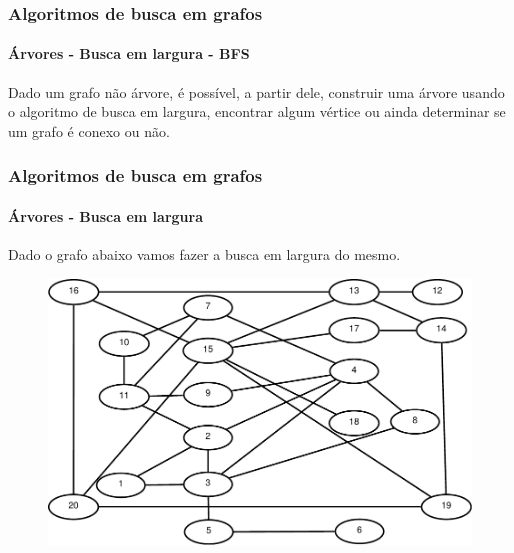 \begin{frame}
	\frametitle{Algoritmos de busca em grafos}
	\framesubtitle{Árvores - Busca em largura - BFS}
	\par Dado um grafo não árvore, é possível, a partir dele, construir uma árvore usando o algoritmo de busca em largura, encontrar algum vértice ou ainda determinar se um grafo é conexo ou não.
\end{frame}

\begin{frame}
	\frametitle{Algoritmos de busca em grafos}
	\framesubtitle{Árvores - Busca em largura}
	\par Dado o grafo abaixo vamos fazer a busca em largura do mesmo.
	\begin{figure}
		\centering
		\includegraphics[width=0.75\linewidth]{images/buscaEmLargura00}
		\caption{}
		\label{fig:buscaemlargura00}
	\end{figure}
\end{frame}

